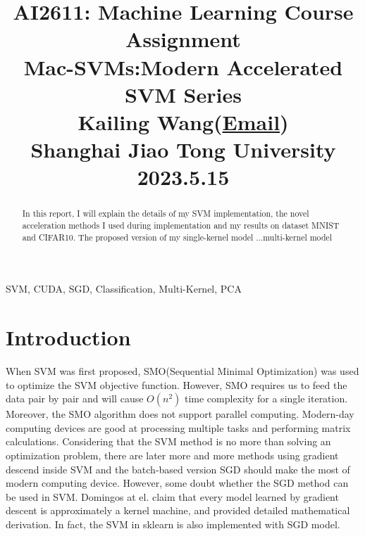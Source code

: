 \documentclass[conference]{IEEEtran}
\begin{document}
	
	\title{AI2611: Machine Learning Course Assignment \\ Mac-SVMs:Modern Accelerated SVM Series  \\
		{\normalsize \vspace{1em} Kailing Wang(\href{mailto:wangkailing151@gmail.com}{Email}) \\ Shanghai Jiao Tong University \\ 2023.5.15}
	}
	
	\maketitle
	
	\begin{abstract}
		In this report, I will explain the details of my SVM implementation, the novel acceleration methods I used during implementation and my results on dataset MNIST and CIFAR10. The proposed version of my single-kernel model ...multi-kernel model
	\end{abstract}
	
	\begin{IEEEkeywords}
		SVM, CUDA, SGD, Classification, Multi-Kernel, PCA
	\end{IEEEkeywords}
	
	\section{\textbf{Introduction}}
	When SVM was first proposed\cite{SVM}, SMO(Sequential Minimal Optimization) was used to optimize the SVM objective function. However, SMO requires us to feed the data pair by pair and will cause $O(n^2)$ time complexity for a single iteration. Moreover, the SMO algorithm does not support parallel computing. Modern-day computing devices are good at processing multiple tasks and performing matrix calculations. Considering that the SVM method is no more than solving an optimization problem, there are later more and more methods\cite{SGD1, SGD2, SGD3, Pegasos} using gradient descend inside SVM and the batch-based version SGD should make the most of modern computing device. However, some doubt whether the SGD method can be used in SVM. Domingos at el. claim that every model learned by gradient descent is approximately a kernel machine\cite{eve}, and provided detailed mathematical derivation. In fact, the SVM in sklearn is also implemented with SGD model. 
\end{document}
